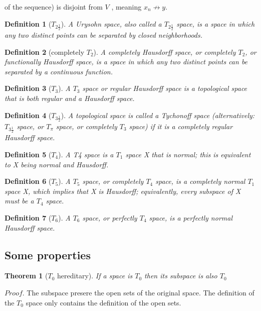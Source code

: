 \documentclass{article}
\newtheorem{definition}{Definition}[section]    %
\newtheorem{theorem}{Theorem}[section]          %
\begin{document}
of the sequence) is disjoint from $V$ , meaning $x_n \not\to y$.\cite[script5]{MAT327topology5script}
\begin{definition}[$T_{2\frac{1}{2}}$]
    A Urysohn space, also called a $T_{2\frac{1}{2}}$
    space, is a space in which any two distinct points
    can be separated by closed neighborhoods.
    \cite[UandcHs]{UandcHs}
\end{definition}
\begin{definition}[completely $T_2$]
    A completely Hausdorff space, or completely $T_2$,
    or functionally
    Hausdorff space, is a space in which any two
    distinct points can be separated by a continuous
    function.
    \cite[UandcHs]{UandcHs}
\end{definition}
\begin{definition}[$T_3$]
    A $T_3$ space or regular Hausdorff space is a
    topological space that is both regular and a
    Hausdorff space.
    \cite[Reglarspace]{Reglarspace}
\end{definition}
\begin{definition}[$T_{3\frac{1}{2}}$]
    A topological space is called a
    Tychonoff space (alternatively:
    $T_{3\frac{1}{2}}$ space, or $T_\pi$ space,
    or completely
    $T_3$ space) if it is a
    completely regular Hausdorff space.
    \cite[Tychonoff]{Tychonoff}
\end{definition}
\begin{definition}[$T_4$]
    A T4 space is a $T_1$ space X that is normal;
    this is equivalent to X being normal and
    Hausdorff.
    \cite[Tychonoff]{Tychonoff}
\end{definition}
\begin{definition}[$T_5$]
    A $T_5$ space, or completely $T_4$ space,
    is a completely normal $T_1$ space X,
    which implies that X is Hausdorff;
    equivalently, every subspace of X
    must be a $T_4$ space.
    \cite[Tychonoff]{Tychonoff}
\end{definition}
\begin{definition}[$T_6$]
    A $T_6$ space, or perfectly $T_4$ space,
    is a perfectly normal Hausdorff space.
    \cite[Tychonoff]{Tychonoff}
\end{definition}

\subsection{Some properties}
\begin{theorem}[$T_0$ hereditary]
    If a space is $T_0$ then its subspace is
    also $T_0$
\end{theorem}
$Proof.$ The subspace presere the open sets
of the original space. The definition of the
$T_0$ space only contains the definition
of the open sets.
\end{document}
